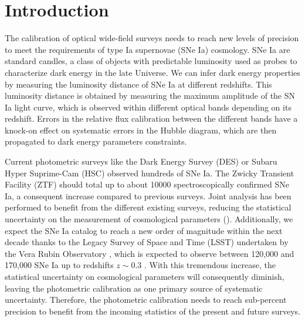 \section{Introduction}

The calibration of optical wide-field surveys needs to reach new levels of precision to meet the requirements of type Ia supernovae (SNe Ia) cosmology. SNe Ia are standard candles, a class of objects with predictable luminosity used as probes to characterize dark energy in the late Universe. We can infer dark energy properties by measuring the luminosity distance of SNe Ia at different redshifts. This luminosity distance is obtained by measuring the maximum amplitude of the SN Ia light curve, which is observed within different optical bands depending on its redshift. Errors in the relative flux calibration between the different bands have a knock-on effect on systematic errors in the Hubble diagram, which are then propagated to dark energy parameters constraints.

Current photometric surveys like the Dark Energy Survey (DES) \citep{Brout_2019} or Subaru Hyper Suprime-Cam (HSC) \citep{hsc_2019} observed hundreds of SNe Ia. The Zwicky Transient Facility (ZTF) \citep{ztf_2022} should total up to about \num{10000} spectroscopically confirmed SNe Ia, a consequent increase compared to previous surveys. Joint analysis has been performed to benefit from the different existing surveys, reducing the statistical uncertainty on the measurement of cosmological parameters (\citealt{Betoule_2014,Scolnic_2018,Brout_2022,rubin2023union}). Additionally, we expect the SNe Ia catalog to reach a new order of magnitude within the next decade thanks to the Legacy Survey of Space and Time (LSST) undertaken by the Vera Rubin Observatory \citep{lsst}, which is expected to observe between 120,000 and 170,000 SNe Ia up to redshifts $z \sim 0.3$ \citep{lsst_2022}. With this tremendous increase, the statistical uncertainty on cosmological parameters will consequently diminish, leaving the photometric calibration as one primary source of systematic uncertainty. Therefore, the photometric calibration needs to reach sub-percent precision to benefit from the incoming statistics of the present and future surveys.

